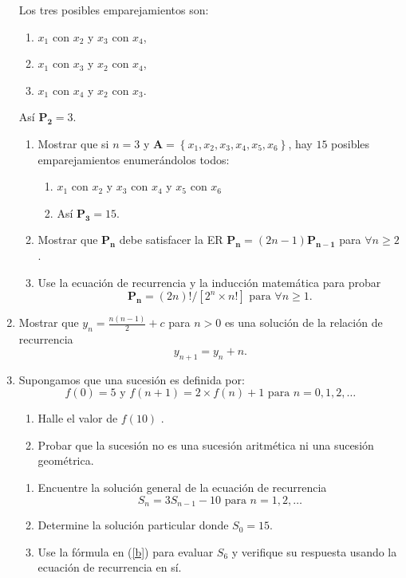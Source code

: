 \begin{enumerate}
    Los tres posibles emparejamientos son:
    \begin{enumerate}
    	\item $x_1$ con $x_2$ y $x_3$ con $x_4$,
    	\item $x_1$ con $x_3$ y $x_2$ con $x_4$,
    	\item $x_1$ con $x_4$ y $x_2$ con $x_3$.
    \end{enumerate}
		Así $\bm{P_2}=3$.
    \begin{enumerate}
        \item Mostrar que si $n=3$ y $\bm{A}=\left\{x_1,x_2,x_3,x_4,x_5,x_6\right\}$, hay $15$ posibles emparejamientos enumerándolos todos:
        \begin{enumerate}
        	\item $x_1$ con $x_2$ y $x_3$ con $x_4$ y $x_5$ con $x_6$
        	\item Así $\bm{P_3}=15$.
        \end{enumerate}
        \item Mostrar que $\bm{P_n}$ debe satisfacer la ER $\bm{P_n}=(2n-1)\bm{P_{n-1}}$ para $\forall n\geq2$.
        \item Use la ecuación de recurrencia y la inducción matemática para probar \[ \bm{P_n}=(2n)!/[2^n\times n!]\text{ para }\forall n\geq 1. \]
    \end{enumerate}
    \item Mostrar que $y_n=\frac{n(n-1)}{2}+c$ para $n>0$ es una solución de la relación de recurrencia \[ y_{n+1}=y_{n}+n. \]
    \item Supongamos que una sucesión es definida por: \[ f(0)=5\text{ y }f(n+1)=2\times f(n)+1\text{ para } n=0,1,2,\ldots \]
    \begin{enumerate}
        \item Halle el valor de $f(10)$ .
        \item Probar que la sucesión no es una sucesión aritmética ni una sucesión geométrica.
    \end{enumerate}
    \begin{enumerate}
        \item Encuentre la solución general de la ecuación de recurrencia \[ S_n=3S_{n-1}-10\text{ para }n=1,2,\ldots \]
        \item\label{b} Determine la solución particular donde $S_{0}=15$.
        \item Use la fórmula en (\ref{b}) para evaluar $S_6$ y verifique su respuesta usando la ecuación de recurrencia en sí.
    \end{enumerate}

\end{enumerate}
